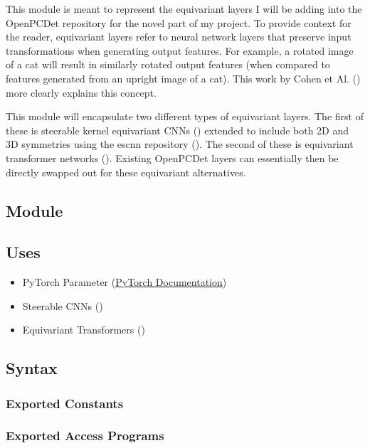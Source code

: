 \documentclass[12pt, titlepage]{article}
\begin{document}
This module is meant to represent the equivariant layers I will be adding into the OpenPCDet repository for the novel part
of my project. To provide context for the reader, equivariant layers
refer to neural network layers that preserve input transformations when generating output features. For example, a rotated image of a cat 
will result in similarly rotated output features (when compared to features generated from an upright image of a cat). This work by Cohen et Al. (\cite{cohen2016group})
more clearly explains this concept.


This module will encapsulate two different types of equivariant layers. The first of these is steerable kernel 
equivariant CNNs (\cite{cohen2016steerable}) extended to include both 2D and 3D symmetries using the escnn repository (\cite{cesa2022a}). 
The second of these is equivariant transformer networks (\cite{tai2019equivariant}). Existing OpenPCDet layers can essentially then be directly
swapped out for these equivariant alternatives. 

\subsection{Module}



\subsection{Uses}
\begin{itemize}
  \item PyTorch Parameter (\href{https://pytorch.org/docs/stable/generated/torch.nn.parameter.Parameter.html}{PyTorch Documentation})
  \item Steerable CNNs (\cite{cesa2022a})
  \item Equivariant Transformers (\cite{tai2019equivariant})
\end{itemize}

\subsection{Syntax}



\subsubsection{Exported Constants}



\subsubsection{Exported Access Programs}
\end{document}
